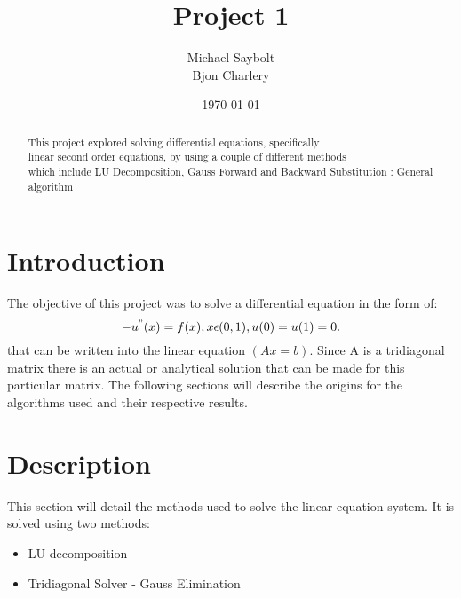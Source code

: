 \documentclass[12pt]{article}
\begin{document}
	\title{Project 1}
	\author{Michael Saybolt \\ Bjon Charlery}
	
	\date{\today}
	\maketitle
	\pagebreak
\begin{abstract}
This project explored solving differential equations, specifically \\linear second order equations, by using a couple of different methods \\ which include LU Decomposition, Gauss Forward and Backward Substitution : General algorithm
\end{abstract}
\bigskip
\bigskip
\section{Introduction}
\indent The objective of this project was to solve a differential equation in the form of:\\ $$-u\textsuperscript{''}(x) = f(x), x\epsilon(0,1),u(0) = u(1) = 0.\\$$ that can be written into the linear equation $(Ax = b)$. Since A is a tridiagonal matrix there is an actual or analytical solution that can be made for this particular matrix. The following sections will describe the origins for the algorithms used and their respective results.
\section{Description}
This section will detail the methods used to solve the linear equation system. It is solved using two methods:\\
\begin{itemize}
	\item \centering LU decomposition
	\item \centering Tridiagonal Solver - Gauss Elimination\\
\end{itemize}
\end{document}
